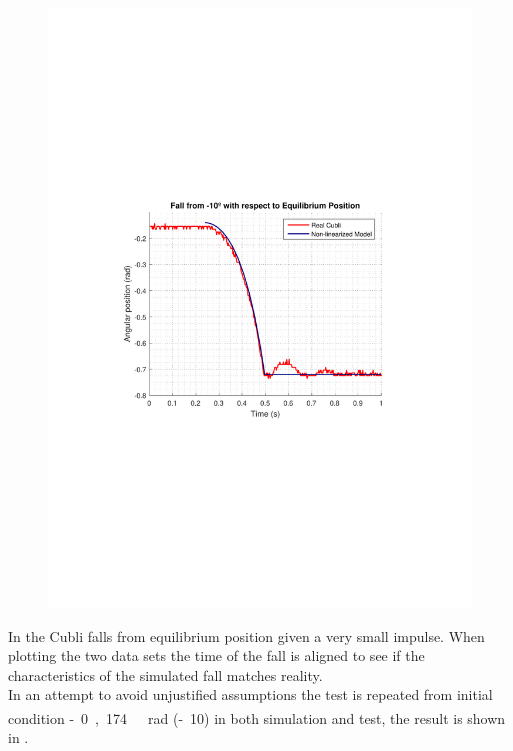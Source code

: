 \begin{minipage}{\linewidth}
\begin{minipage}{0.5\linewidth}
\begin{figure}[H]
			\includegraphics[scale=.48]{figures/FallTestComparison10deg}
			\centering
			\captionsetup{justification=centering}
			\label{FallTestComparison10deg}
		\end{figure}\vspace{-5mm}
	\end{minipage}
\end{minipage}

In  the Cubli falls from equilibrium position given a very small impulse. When plotting the two data sets the time of the fall is aligned to see if the characteristics of the simulated fall matches reality.\\
In an attempt to avoid unjustified assumptions the test is repeated from initial condition \si{-0,174\ rad} (\si{-10^\circ}) in both simulation and test, the result is shown in .

